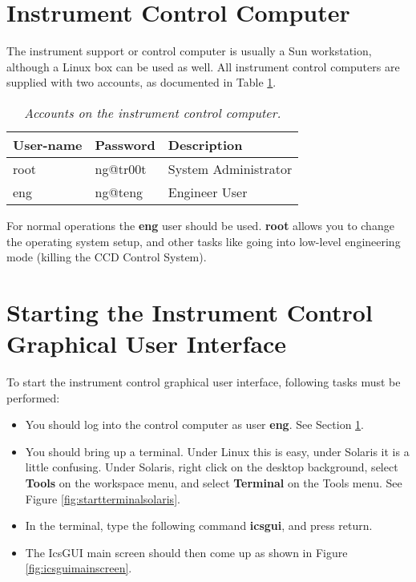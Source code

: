 \documentclass[10pt,a4paper]{article}
\begin{document}
\section{Instrument Control Computer}
\label{sec:instrumentcontrolcomputer}

The instrument support or control computer is usually a Sun workstation, although a Linux box can be used as well.
All instrument control computers are supplied with two accounts, as documented in Table \ref{tab:iscaccounts}.

\begin{table}[!h]
\begin{center}
\begin{tabular}{|l|l|p{10em}|}
\hline
{\bf User-name} & {\bf Password} 	& {\bf Description} \\ \hline
root 		& ng@tr00t 		& System Administrator \\ \hline
eng 		& ng@teng 		& Engineer User \\ \hline
\end{tabular}
\end{center}
\caption{\em Accounts on the instrument control computer.}
\label{tab:iscaccounts}
\end{table}

For normal operations the {\bf eng} user should be used. {\bf root} allows you to change the operating system
setup, and other tasks like going into low-level engineering mode (killing the CCD Control System).

\section{Starting the Instrument Control Graphical User Interface}
\label{sec:starticsgui}

To start the instrument control graphical user interface, following tasks must be performed:

\begin{itemize}
\item You should log into the control computer as user {\bf eng}. See Section \ref{sec:instrumentcontrolcomputer}.
\item You should bring up a terminal. Under Linux this is easy, under Solaris it is a little confusing.
	Under Solaris, right click on the desktop background, select {\bf Tools} on the workspace menu, and select
	{\bf Terminal} on the Tools menu. See Figure \ref{fig:startterminalsolaris}.
\item In the terminal, type the following command {\bf icsgui}, and press return.
\item The IcsGUI main screen should then come up as shown in Figure \ref{fig:icsguimainscreen}.
\end{itemize}
\end{document}
